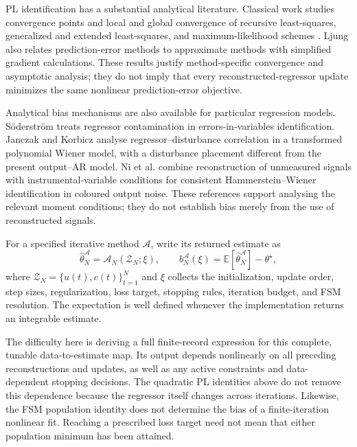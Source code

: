 PL identification has a substantial analytical literature. Classical
work studies convergence points and local and global convergence of
recursive least-squares, generalized and extended least-squares, and
maximum-likelihood schemes
\cite{SoderstromLjungGustavsson1978,LjungSoderstrom1983}.
Ljung \cite{Ljung1981} also relates prediction-error methods to
approximate methods with simplified gradient calculations.
These results justify method-specific convergence and asymptotic
analysis; they do not imply that every reconstructed-regressor update
minimizes the same nonlinear prediction-error objective.

Analytical bias mechanisms are also available for particular regression
models. S{\"o}derstr{\"o}m \cite{Soderstrom2007} treats regressor contamination
in errors-in-variables identification. Janczak and Korbicz
\cite{JanczakKorbicz2019} analyse regressor--disturbance correlation in
a transformed polynomial Wiener model, with a disturbance placement
different from the present output--AR model. Ni et al.
\cite{NiGilsonGarnier2013} combine reconstruction of unmeasured signals
with instrumental-variable conditions for consistent
Hammerstein--Wiener identification in coloured output noise.
These references support analysing the relevant moment conditions;
they do not establish bias merely from the use of reconstructed signals.

For a specified iterative method $\mathcal A$, write its returned estimate as
\begin{equation}
\label{eq:bias_algorithm_definition}
 \widehat\theta_N^{\mathcal A}
 =\mathcal A_N(\mathcal Z_N;\xi),
 \qquad
 b_N^{\mathcal A}(\xi)
 =\mathbb E[\widehat\theta_N^{\mathcal A}]-\theta^\star,
\end{equation}
where $\mathcal Z_N=\{u(t),c(t)\}_{t=1}^N$ and $\xi$ collects the
initialization, update order, step sizes, regularization, loss target,
stopping rules, iteration budget, and FSM resolution. The expectation
is well defined whenever the implementation returns an integrable estimate.

The difficulty here is deriving a full finite-record expression for this
complete, tunable data-to-estimate map. Its output depends nonlinearly
on all preceding reconstructions and updates, as well as any active
constraints and data-dependent stopping decisions. The quadratic PL
identities above do not remove this dependence because the regressor
itself changes across iterations. Likewise, the FSM population identity
does not determine the bias of a finite-iteration nonlinear fit.
Reaching a prescribed loss target need not mean that either
population minimum has been attained.

